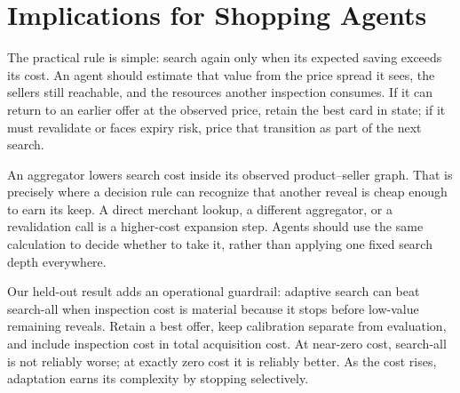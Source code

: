 \section{Implications for Shopping Agents}
\label{sec:implications}

The practical rule is simple: search again only when its expected saving exceeds its
cost. An agent should estimate that value from the price spread it sees, the sellers
still reachable, and the resources another inspection consumes. If it can return to
an earlier offer at the observed price, retain the best card in state; if it must
revalidate or faces expiry risk, price that transition as part of the next search.

An aggregator lowers search cost inside its observed product--seller graph. That is
precisely where a decision rule can recognize that another reveal is cheap enough to
earn its keep. A direct merchant lookup, a different aggregator, or a revalidation
call is a higher-cost expansion step. Agents should use the same calculation to
decide whether to take it, rather than applying one fixed search depth everywhere.

Our held-out result adds an operational guardrail: adaptive search can beat search-all
when inspection cost is material because it stops before low-value remaining reveals.
Retain a best offer, keep calibration separate from evaluation, and include inspection
cost in total acquisition cost. At near-zero cost, search-all is not reliably worse;
at exactly zero cost it is reliably better. As the cost rises, adaptation earns its
complexity by stopping selectively.